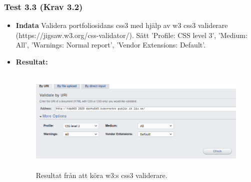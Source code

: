 \documentclass{TDP003mall}
\begin{document}
\subsubsection*{Test 3.3 (Krav 3.2)}
\begin{itemize}
\item[]\textbf{Indata} Validera portfoliosidans css3 med hjälp av w3 css3 validerare (https://jigsaw.w3.org/css-validator/). Sätt 'Profile: CSS level 3', 'Medium: All', 'Warnings: Normal report', 'Vendor Extensions: Default'.
\item[]\textbf{Resultat:}
\begin{figure}[h!]
\centerline{\includegraphics[width=\textwidth, height=5cm]{../Pictures/css3_validation.png}}
\caption{Resultat från att köra w3:s css3 validerare.\label{fig:}}
\end{figure}
\end{itemize}
\end{document}
